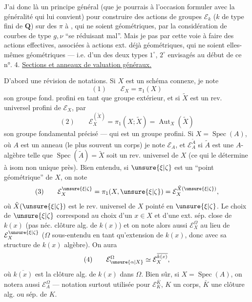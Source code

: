 J'ai donc là un principe général (que je pourrais à l'occasion formuler avec la généralité qui lui convient) pour construire des actions   de groupes $\mathcal E_k$ ($k$  de type fini de $\mathbf Q$) sur des $\pi$ à , qui  ne soient géométriques, par  la considération de courbes de type $g,\nu$ ``se réduisant mal''. Mais je 
pas par cette voie à faire des actions  effectives, associées à  actions ext. déjà géométriques, qui ne soient elles-mêmes géométriques --- i.e. d'un des deux types $1^\circ$, $2^\circ$ envisagés au début de ce n°.
4. \uline{Sections  et anneaux de valuation généraux.}

D'abord une révision de notations. Si $X$ est un schéma connexe, je note 
\[
(1)\qquad \mathcal E_X=\pi_1(X)
\]
son groupe fond. profini en tant que groupe extérieur, et si $\tilde X$ est un rev. universel profini de $\mathcal E_X$, par
\[
(2)\qquad \mathcal E_X^{(\tilde X)}=\pi_1(X;\tilde X)=\operatorname{Aut}_X(\tilde X)
\]
son groupe fondamental précisé --- qui est un groupe profini. Si $X=\operatorname{Spec}(A)$, où $A$ est un anneau (le plus souvent un corps) je note $\mathcal E_A$, et $\mathcal E_A^{\tilde A}$  si $\tilde A$ est une $A$-algèbre telle que $\operatorname{Spec}(\tilde A)=\tilde X$ soit un rev. universel de $X$ (ce qui le détermine à isom non unique près). Bien entendu, si $\unsure{\xi|\zeta}$ est un ``point géométrique'' de $X$, on note
\[
(3)\qquad \mathcal E_X^{\unsure{\xi|\zeta}}=\pi_1(X,\unsure{\xi|\zeta})=\mathcal E_X^{\tilde X(\unsure{\xi|\zeta})},
\]
où $\tilde X(\unsure{\xi|\zeta})$ est le rev. universel de $X$ pointé en $\unsure{\xi|\zeta}$. Le choix
de $\unsure{\xi|\zeta}$ correspond au choix d'un $x\in X$ et d'une ext. sép. close  \inserted{$\Omega$} de $k(x)$ (pas néc.  clôture alg. de $k(x)$) et on note alors aussi $\mathcal E_X^\Omega$ au lieu de $\mathcal E_X^{\unsure{\xi|\zeta}}$ ($\Omega$ sous-entendu en tant qu'extension de $k(x)$, donc avec sa structure de $k(x)$ algèbre). On aura 
\[
(4)\qquad \mathcal E_{\unsure{\alpha|X}}^\Omega\simeq\mathcal E_X^{\overline{k(x)}},
\]
où $\overline{k(x)}$ est la clôture alg. de $k(x)$ dans $\Omega$. Bien sûr, si $X=\operatorname{Spec}(A)$, on notera aussi $\mathcal E_A^\Omega$ --- notation surtout utilisée pour $\mathcal E_K^{\bar K}$, $K$ un corps, $\bar K$ une clôture alg. ou sép. de $K$.

